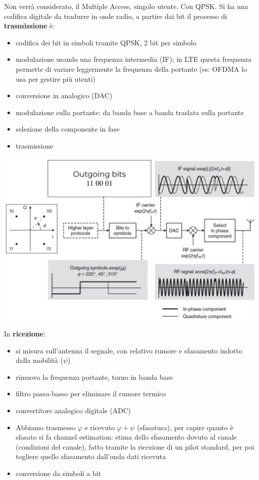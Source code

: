 Non verrà considerato, il Multiple Access, singolo utente. Con QPSK. Si ha una codifica digitale da tradurre in onde radio, a partire dai bit il processo di \textbf{trasmissione} è:
\begin{itemize}
	\item codifica dei bit in simboli tramite QPSK, 2 bit per simbolo
	\item modulazione usando una frequenza intermedia (IF); in LTE questa frequenza permette di variare leggermente la frequenza della portante (es: OFDMA lo usa per gestire più utenti)
	\item conversione in analogico (DAC)
	\item modulazione sulla portante: da banda base a banda traslata sulla portante
	\item selezione della componente in fase 
	\item trasmissione
\end{itemize}
\begin{center}
	\includegraphics[width=0.9\linewidth]{img/mobile/mightbesending}
\end{center}

In \textbf{ricezione}: 
\begin{itemize}
	\item si misura sull'antenna il segnale, con relativo rumore e sfasamento indotto dalla mobilità ($\psi$)
	\item rimuovo la frequenza portante, torno in banda base
	\item filtro passa-basso per eliminare il rumore termico
	\item convertitore analogico digitale (ADC)
	\item Abbiamo trasmesso $\varphi$ e ricevuto $\varphi + \psi$ (sfasatura), per capire quanto è sfasato si fa channel estimation: stima dello sfasamento dovuto al canale (condizioni del canale), fatto tramite la ricezione di un pilot standard, per poi togliere quello sfasamento dall'onda dati ricevuta
	\item conversione da simboli a bit
\end{itemize}


